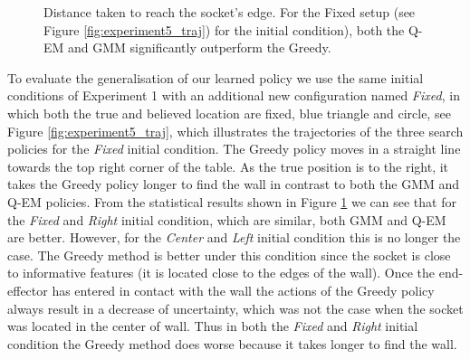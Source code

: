 \begin{figure}
 \centering
    \caption{Distance taken to reach the socket's edge. For the Fixed setup (see Figure \ref{fig:experiment5_traj}) for 
    the initial condition), both the Q-EM and GMM significantly outperform the Greedy. }
    \label{fig:experiment5_stats}
\end{figure}

To evaluate the generalisation of our learned policy we use the same initial conditions of Experiment 1 with an additional 
new configuration named \textit{Fixed}, in which both the true and believed location are fixed, blue triangle and circle,
see Figure \ref{fig:experiment5_traj}, which illustrates the trajectories 
of the three search policies for the \textit{Fixed} initial condition. The Greedy policy moves in a straight line towards the top
right corner of the table. As the true position is to the right, it takes the Greedy policy longer to find the wall 
in contrast to both the GMM and Q-EM policies. From the statistical results shown in Figure \ref{fig:experiment5_stats} we can see
that for the \textit{Fixed} and \textit{Right} initial condition, which are similar, both GMM and Q-EM are better. However, for 
the \textit{Center} and \textit{Left} initial condition this is no longer the case. 
The Greedy method is better under this condition since the socket is close to informative features (it is located close to the edges of the wall). 
Once the end-effector has entered in contact with the wall the actions of the Greedy policy always result in a decrease of uncertainty, which was not the case when the socket was located in the center of wall. 
Thus in both the \textit{Fixed} and \textit{Right} initial condition the Greedy method does worse because it takes longer
to find the wall.

